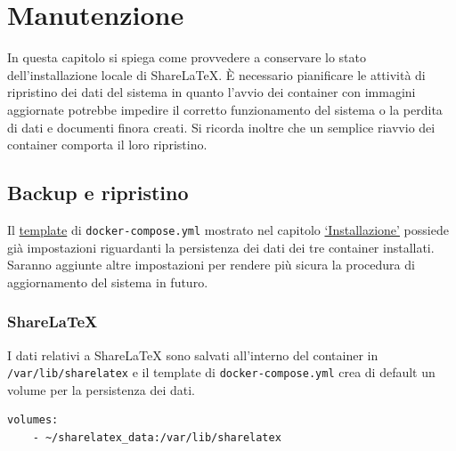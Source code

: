 \chapter{Manutenzione}
\label{Manutenzione}
\thispagestyle{empty}

In questa capitolo si spiega come provvedere a conservare lo stato dell'installazione locale di ShareLaTeX. È necessario pianificare le attività di ripristino dei dati del sistema in quanto l'avvio dei container con immagini aggiornate potrebbe impedire il corretto funzionamento del sistema o la perdita di dati e documenti finora creati. Si ricorda inoltre che un semplice riavvio dei container comporta il loro ripristino.

\section{Backup e ripristino}
Il \hyperref[code:docker-compose.yml]{template} di \verb|docker-compose.yml| mostrato nel capitolo \hyperref[Installazione]{\enquote*{Installazione}} possiede già impostazioni riguardanti la persistenza dei dati dei tre container installati. Saranno aggiunte altre impostazioni per rendere più sicura la procedura di aggiornamento del sistema in futuro.

\subsection{ShareLaTeX}
I dati relativi a ShareLaTeX sono salvati all'interno del container in \verb|/var/lib/sharelatex| e il template di \verb|docker-compose.yml| crea di default un volume per la persistenza dei dati.
\begin{lstlisting}
volumes:
    - ~/sharelatex_data:/var/lib/sharelatex
\end{lstlisting}

